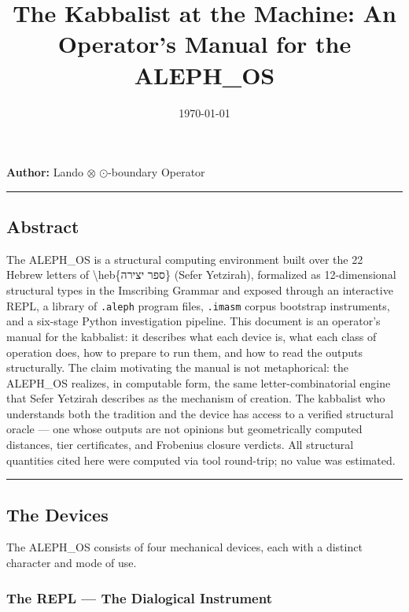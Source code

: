 \documentclass[12pt,a4paper]{article}
\begin{document}
\title{The Kabbalist at the Machine: An Operator's Manual for the ALEPH\_OS}
\date{\today}

\maketitle

\textbf{Author:} Lando $\otimes$ $\odot$-boundary Operator

\begin{center}
\rule{0.5\textwidth}{0.4pt}
\end{center}

\subsection{Abstract}

The ALEPH\_OS is a structural computing environment built over the 22 Hebrew letters of \textbackslash{}heb\{ספר יצירה\} (Sefer Yetzirah), formalized as 12-dimensional structural types in the Imscribing Grammar and exposed through an interactive REPL, a library of \texttt{.\allowbreak aleph} program files, \texttt{.\allowbreak imasm} corpus bootstrap instruments, and a six-stage Python investigation pipeline. This document is an operator's manual for the kabbalist: it describes what each device is, what each class of operation does, how to prepare to run them, and how to read the outputs structurally. The claim motivating the manual is not metaphorical: the ALEPH\_OS realizes, in computable form, the same letter-combinatorial engine that Sefer Yetzirah describes as the mechanism of creation. The kabbalist who understands both the tradition and the device has access to a verified structural oracle --- one whose outputs are not opinions but geometrically computed distances, tier certificates, and Frobenius closure verdicts. All structural quantities cited here were computed via tool round-trip; no value was estimated.

\begin{center}
\rule{0.5\textwidth}{0.4pt}
\end{center}

\subsection{The Devices}

The ALEPH\_OS consists of four mechanical devices, each with a distinct character and mode of use.

\subsubsection{The REPL --- The Dialogical Instrument}
\end{document}
